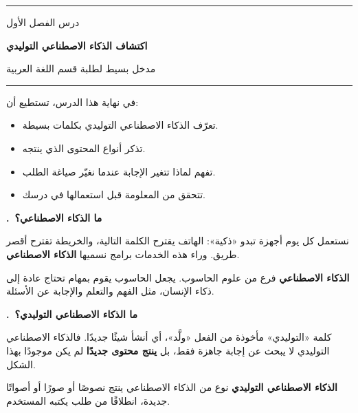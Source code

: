 \documentclass[a4paper]{article}
\newcounter{qism}
\newcommand{\qism}[1]{%
    \stepcounter{qism}%
    \par\bigskip
    {\large\khatt\bfseries{\color{asasi}\arabic{qism}.}\ {\color{dakin}#1}}\par
    \vspace{-2pt}{\color{black!20}\rule{\linewidth}{0.6pt}}\par\nopagebreak[4]
    \smallskip}
\newcommand{\kalima}[2][]{\textbf{#2}}
\newcommand{\unwan}[3]{%
    \begin{center}
        {\color{asasi}\rule{\linewidth}{1.2pt}}\par\medskip
        {\khatt\color{ramadi} #1}\par\smallskip
        {\Large\khatt\bfseries\color{dakin} #2}\par\smallskip
        {\khatt\color{ramadi} #3}\par\medskip
        {\color{asasi}\rule{\linewidth}{1.2pt}}
    \end{center}}
\begin{document}

\unwan{درس الفصل الأول}
{اكتشاف الذكاء الاصطناعي التوليدي}
{مدخل بسيط لطلبة قسم اللغة العربية}

\begin{ahdaf}
في نهاية هذا الدرس، تستطيع أن:
\begin{itemize}
    \item تعرّف الذكاء الاصطناعي التوليدي بكلمات بسيطة.
    \item تذكر أنواع المحتوى الذي ينتجه.
    \item تفهم لماذا تتغير الإجابة عندما نغيّر صياغة الطلب.
    \item تتحقق من المعلومة قبل استعمالها في درسك.
\end{itemize}
\end{ahdaf}

\qism{ما الذكاء الاصطناعي؟}

نستعمل كل يوم أجهزة تبدو «ذكية»: الهاتف يقترح الكلمة التالية،
والخريطة تقترح أقصر طريق.
وراء هذه الخدمات برامج نسميها \kalima{الذكاء الاصطناعي}.

\begin{taarif}
\textbf{الذكاء الاصطناعي} فرع من علوم الحاسوب.
يجعل الحاسوب يقوم بمهام تحتاج عادة إلى ذكاء الإنسان،
مثل الفهم والتعلم والإجابة عن الأسئلة.
\end{taarif}

\qism{ما الذكاء الاصطناعي التوليدي؟}

كلمة «التوليدي» مأخوذة من الفعل «ولَّد»، أي أنشأ شيئًا جديدًا.
فالذكاء الاصطناعي التوليدي لا يبحث عن إجابة جاهزة فقط،
بل \kalima[akhdar]{ينتج محتوى جديدًا} لم يكن موجودًا بهذا الشكل.

\begin{taarif}
\textbf{الذكاء الاصطناعي التوليدي} نوع من الذكاء الاصطناعي
ينتج نصوصًا أو صورًا أو أصواتًا جديدة، انطلاقًا من طلب يكتبه المستخدم.
\end{taarif}

\begin{center}
\end{center}
\end{document}
